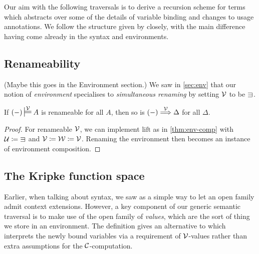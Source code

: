 Our aim with the following traversals is to derive a recursion scheme for
terms which abstracts over some of the details of variable binding and
changes to usage annotations.
We follow the structure given by \citet{AACMM20} closely, with
the main difference having come already in the syntax and environments.

\subsection{Renameability}

{\color{red}(Maybe this goes in the Environment section.)}
We saw in \cref{sec:env} that our notion of \emph{environment} specialises to
\emph{simultaneous renaming} by setting $\V$ to be $\sqni$.


\begin{lemma}\label{thm:env-ren}
  If $\plr{-} \sdtstile{}\V A$ is renameable for all $A$, then so is
  $\plr{-} \env\V \Delta$ for all $\Delta$.
\end{lemma}
\begin{proof}
  For renameable $\V$, we can implement $\mathrm{lift}$ as in
  \cref{thm:env-comp} with $\U \coloneqq {\sqni}$ and
  $\mathcal V \coloneqq \mathcal W \coloneqq \mathcal V$.
  Renaming the environment then becomes an instance of environment composition.
\end{proof}

\subsection{The Kripke function space}

Earlier, when talking about syntax, we saw  as a simple way
to let an open family admit context extensions.
However, a key component of our generic semantic traversal is to make use of
the open family \AgdaBound{$\V$} of \emph{values}, which are the sort of thing
we store in an environment.
The definition  gives an alternative to
 which interprets the newly bound variables via a
requirement of $\V$-values rather than extra assumptions for the
$\mathcal C$-computation.


